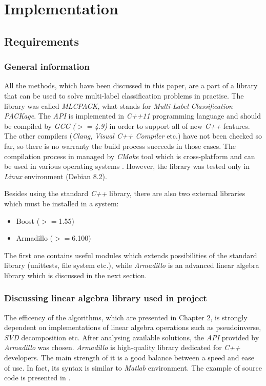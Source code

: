 \chapter{Implementation}

\section{Requirements}

\subsection{General information}
All the methods, which have been discussed in this paper, are a part of a library that can be used to solve multi-label classification problems in practise. The library was called \textit{MLCPACK}, what stands for \textit{Multi-Label Classification PACKage}. The \textit{API} is implemented in \textit{C++11} programming language and should be compiled by \textit{GCC ($>=$4.9)} in order to support all of new \textit{C++} features. The other compilers (\textit{Clang}, \textit{Visual C++ Compiler} etc.) have not been checked so far, so there is no warranty the build process succeeds in those cases.  The compilation process in managed by \textit{CMake} tool which is cross-platform and can be used in various operating systems \cite{CMake}. However, the library was tested only in \textit{Linux} environment (Debian 8.2). 

Besides using the standard \textit{C++} library, there are also two external libraries which must be installed in a system: 

\begin{itemize}
    \item Boost ($>=$1.55)
    \item Armadillo ($>=$6.100)
\end{itemize}
The first one contains useful modules which extends possibilities of the standard library (unittests, file system etc.), while \textit{Armadillo} is an advanced linear algebra library which is discussed in the next section.  


\subsection{Discussing linear algebra library used in project}

The efficency of the algorithms, which are presented in Chapter 2, is strongly dependent on implementations of linear algebra operations such as pseudoinverse, \textit{SVD} decomposition etc. After analysing available solutions, the \textit{API} provided by \textit{Armadillo} was chosen. \textit{Armadillo} is high-quality library dedicated for \textit{C++} developers. The main strength of it is a good balance between a speed and ease of use. In fact, its syntax is similar to \textit{Matlab} environment. The example of source code is presented in .

